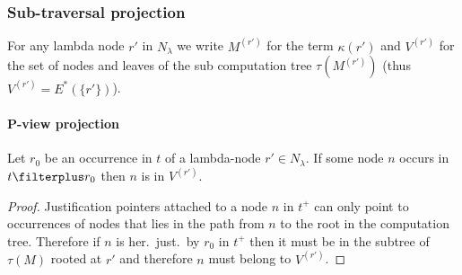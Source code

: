 \subsubsection{Sub-traversal projection}

For any lambda node $r'$ in $N_\lambda$ we write
$M^{(r')}$ for the term $\kappa(r')$ and $V^{(r')}$ for the set of nodes and leaves of the sub computation tree $\tau(M^{(r')})$ (thus $V^{(r')} = E^*(\{r'\})$).

\paragraph{P-view projection}

\begin{lemma}
\label{lem:inproj_imp_insubtree} Let $r_0$ be an occurrence in $t$
of a lambda-node $r' \in N_\lambda$. If some node $n$ occurs in $t
\filterplus r_0$ then $n$ is in $V^{(r')}$.
\end{lemma}
\begin{proof}
Justification pointers attached to a node $n$ in $t^+$ can only point to
 occurrences of nodes that lies in the path from $n$ to the root
 in the computation tree. Therefore if $n$ is her.\
 just.\ by $r_0$ in $t^+$ then it must be in the subtree of $\tau(M)$ rooted
 at $r'$ and  therefore $n$ must belong to $V^{(r')}$.
\end{proof}

